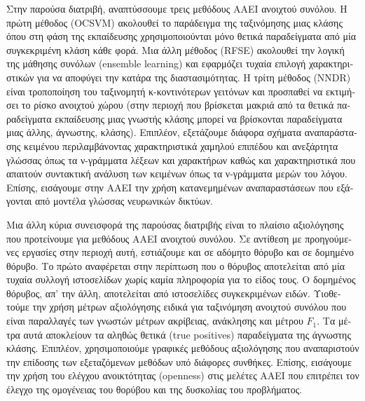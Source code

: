 \documentclass[
    12pt, %
    singlespacing, %
    liststotoc, %
    headsepline, %
]{DoctoralThesis} %
\begin{document}
\begin{abstractGR}
\begin{greek}
Στην παρούσα διατριβή, αναπτύσσουμε τρεις μεθόδους ΑΑΕΙ ανοιχτού συνόλου. Η πρώτη μέθοδος (OCSVM) ακολουθεί το παράδειγμα της ταξινόμησης μιας κλάσης όπου στη φάση της εκπαίδευσης χρησιμοποιούνται μόνο θετικά παραδείγματα από μία συγκεκριμένη κλάση κάθε φορά. Μια άλλη μέθοδος (RFSE) ακολουθεί την λογική της μάθησης συνόλων (ensemble learning) και εφαρμόζει τυχαία επιλογή χαρακτηριστικών για να αποφύγει την κατάρα της διαστασιμότητας. Η τρίτη μέθοδος (NNDR) είναι τροποποίηση του ταξινομητή κ-κοντινότερων γειτόνων και προσπαθεί να εκτιμήσει το ρίσκο ανοιχτού χώρου (στην περιοχή που βρίσκεται μακριά από τα θετικά παραδείγματα εκπαίδευσης μιας γνωστής κλάσης μπορεί να βρίσκονται παραδείγματα μιας άλλης, άγνωστης, κλάσης). Επιπλέον, εξετάζουμε διάφορα σχήματα αναπαράστασης κειμένου περιλαμβάνοντας χαρακτηριστικά χαμηλού επιπέδου και ανεξάρτητα γλώσσας όπως τα ν-γράμματα λέξεων και χαρακτήρων καθώς και χαρακτηριστικά που απαιτούν συντακτική ανάλυση των κειμένων όπως τα ν-γράμματα μερών του λόγου. Επίσης, εισάγουμε στην ΑΑΕΙ την χρήση κατανεμημένων αναπαραστάσεων που εξάγονται από μοντέλα γλώσσας νευρωνικών δικτύων. 

Μια άλλη κύρια συνεισφορά της παρούσας διατριβής είναι το πλαίσιο αξιολόγησης που προτείνουμε για μεθόδους ΑΑΕΙ ανοιχτού συνόλου. Σε αντίθεση με προηγούμενες εργασίες στην περιοχή αυτή, εστιάζουμε και σε αδόμητο θόρυβο και σε δομημένο θόρυβο. Το πρώτο αναφέρεται στην περίπτωση που ο θόρυβος αποτελείται από μία τυχαία συλλογή ιστοσελίδων χωρίς καμία πληροφορία για το είδος τους. Ο δομημένος θόρυβος, απ’ την άλλη, αποτελείται από ιστοσελίδες συγκεκριμένων ειδών. Υιοθετούμε την χρήση μέτρων αξιολόγησης ειδικά για ταξινόμηση ανοιχτού συνόλου που είναι παραλλαγές των γνωστών μέτρων ακρίβειας, ανάκλησης και μέτρου $F_1$. Τα μέτρα αυτά αποκλείουν τα αληθώς θετικά (true positives) παραδείγματα της άγνωστης κλάσης. Επιπλέον, χρησιμοποιούμε γραφικές μεθόδους αξιολόγησης που αναπαριστούν την επίδοσης των εξεταζόμενων μεθόδων υπό διάφορες συνθήκες. Επίσης, εισάγουμε την χρήση του ελέγχου ανοικτότητας (openness) στις μελέτες ΑΑΕΙ που επιτρέπει τον έλεγχο της ομογένειας του θορύβου και της δυσκολίας του προβλήματος. 


\end{greek}
\end{abstractGR}
\end{document}
